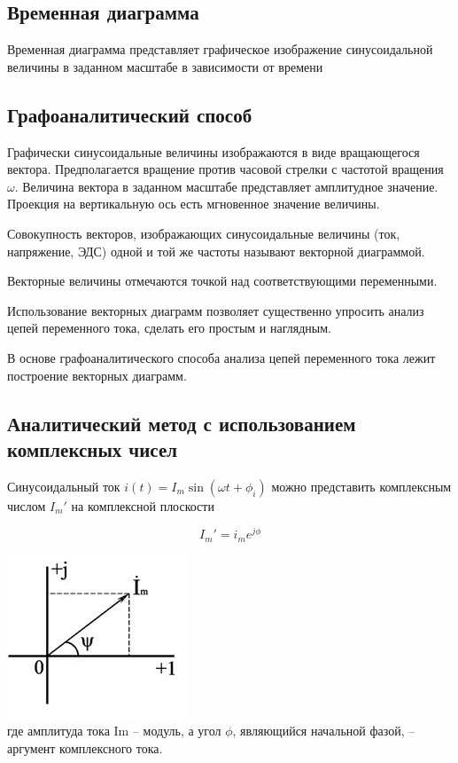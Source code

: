 \documentclass[a4paper, 12pt]{article}
\begin{document}
\subsection{Временная диаграмма}
Временная диаграмма представляет графическое изображение синусоидальной величины в заданном масштабе в зависимости от времени
\subsection{Графоаналитический способ}
Графически синусоидальные величины изображаются в виде вращающегося вектора. Предполагается вращение против часовой стрелки с частотой вращения $ \omega $. Величина вектора в заданном масштабе представляет амплитудное значение. Проекция на вертикальную ось есть мгновенное значение величины.

Совокупность векторов, изображающих синусоидальные величины (ток, напряжение, ЭДС) одной и той же частоты называют векторной диаграммой.

Векторные величины отмечаются точкой над соответствующими переменными.

Использование векторных диаграмм позволяет существенно упросить анализ цепей переменного тока, сделать его простым и наглядным.

В основе графоаналитического способа анализа цепей переменного тока лежит построение векторных диаграмм.
\subsection{Аналитический метод с использованием комплексных чисел}
Синусоидальный ток $ i(t) = I_m \sin(\omega t + \phi_i) $ можно представить комплексным числом $ I_m' $ на комплексной плоскости

\[
    I_m' = i_m e^{j\phi}
\]

\includegraphics{27-1.png}\\

где амплитуда тока Im – модуль, а угол $ \phi $, являющийся начальной фазой, – аргумент комплексного тока.
\end{document}
